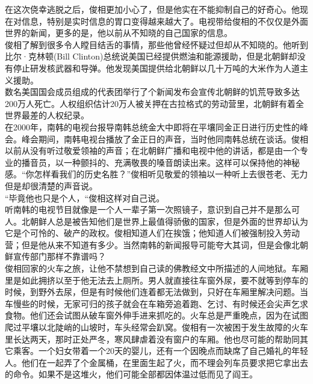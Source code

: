 \begin{multicols}{\theparacolNo}
在这次侥幸逃脱之后，俊相更加小心了，但是他实在不能抑制自己的好奇心。他现在对信息，特别是实时信息的胃口变得越来越大了。电视带给俊相的不仅仅是外面世界的新闻，更多的是，他以前从不知晓的自己国家的信息。\\

俊相了解到很多令人瞠目结舌的事情，那些他曾经怀疑过但却从不知晓的。他听到比尔·克林顿(Bill Clinton)总统说美国已经提供燃油和能源援助，但是北朝鲜却没有停止研发核武器和导弹。他发现美国提供给北朝鲜以几十万吨的大米作为人道主义援助。\\

数名美国国会成员组成的代表团举行了个新闻发布会宣传北朝鲜的饥荒导致多达200万人死亡。人权组织估计20万人被关押在古拉格式的劳动营里，北朝鲜有着全世界最差的人权纪录。\\

在2000年，南韩的电视台报导南韩总统金大中即将在平壤同金正日进行历史性的峰会。峰会期间，南韩电视台播放了金正日的声音，当时他同南韩总统在谈话。俊相以前从没有听过敬爱领袖的声音；在北朝鲜广播和电视中他的讲话，都是由一个专业的播音员，以一种颤抖的、充满敬畏的嗓音朗读出来。这样可以保持他的神秘感。“你怎样看我们的历史名胜？”俊相听见敬爱的领袖以一种听上去很苍老、无力但是却很清楚的声音说。\\

“毕竟他也只是个人，“俊相这样对自己说。\\

听南韩的电视节目就像是一个人一辈子第一次照镜子，意识到自己并不是那么可人。北朝鲜人总是被告知他们是世界上最值得骄傲的国家，但是外面的世界却认为它是个可怜的、破产的政权。俊相知道人们在挨饿；他知道人们被强制投入劳动营；但是他从来不知道有多少。当然南韩的新闻报导可能夸大其词，但是会像北朝鲜宣传部门那样不靠谱吗？\\

俊相回家的火车之旅，让他不禁想到自己读的佛教经文中所描述的人间地狱。车厢里是如此拥挤以至于他无法去上厕所。男人就直接往车窗外尿，要不就等到停车的时候，到野外去尿，但是有时候他们连着都无法做到，只好在车厢里解决问题。当车慢些的时候，无家可归的孩子就会在车箱旁追着跑、乞讨、有时候还会尖声乞求食物。他们还会试图从破车窗外伸手进来抓吃的。火车总是严重晚点，因为在试图爬过平壤以北陡峭的山坡时，车头经常会趴窝。俊相有一次被困于发生故障的火车里长达两天，那时正处严冬，寒风肆虐着没有窗户的车厢。他也尽可能的帮助同其它乘客。一个妇女带着一个20天的婴儿，还有一个因晚点而缺席了自己婚礼的年轻人。他们在一起弄了个金属桶，在里面生起了火，而不理会列车员要求把它拿出去的命令。如果不是这堆火，他们可能全部都因体温过低而见了阎王。\\


\end{multicols}
